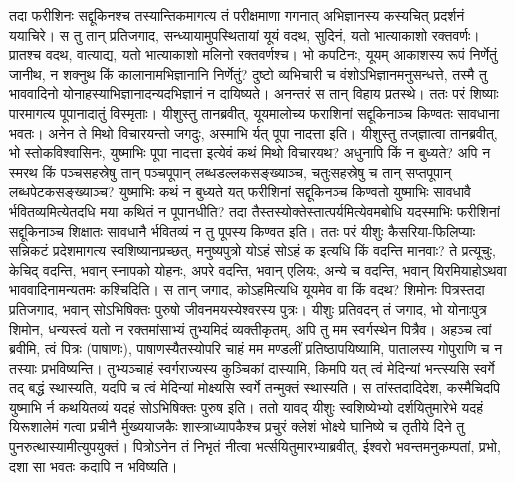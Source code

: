 \adhyAya
{}
\vakya तदा फरीशिनः सद्दूकिनश्च तस्यान्तिकमागत्य तं परीक्षमाणा गगनात् अभिज्ञानस्य कस्यचित् प्रदर्शनं ययाचिरे।
\vakya स तु तान् प्रतिजगाद, सन्ध्यायामुपस्थितायां यूयं वदथ, सुदिनं, यतो भात्याकाशो रक्तवर्णः।
\vakya प्रातश्च वदथ, वात्याद्य, यतो भात्याकाशो मलिनो रक्तवर्णश्च। भो कपटिनः, यूयम् आकाशस्य रूपं निर्णेतुं जानीथ, न शक्नुथ किं कालानामभिज्ञानानि निर्णेतुं?
\vakya दुष्टो व्यभिचारी च वंशोऽभिज्ञानमनुसन्धत्ते, तस्मै तु भाववादिनो योनाहस्याभिज्ञानादन्यदभिज्ञानं न दायिष्यते। अनन्तरं स तान् विहाय प्रतस्थे।
\vakya ततः परं शिष्याः पारमागत्य पूपानादातुं विस्मृताः।
\vakya यीशुस्तु तानब्रवीत्, यूयमालोच्य फराशिनां सद्दूकिनाञ्च किण्वतः सावधाना भवतः।
\vakya अनेन ते मिथो विचारयन्तो जगदुः, अस्माभि र्यत् पूपा नादत्ता इति।
\vakya यीशुस्तु तज्‌ज्ञात्वा तानब्रवीत्, भो स्तोकविश्वासिनः, युष्माभिः पूपा नादत्ता इत्येवं कथं मिथो विचारयथ?
\vakya अधुनापि किं न बुध्यते? अपि न स्मरथ किं पञ्चसहस्रेषु तान् पञ्चपूपान् लब्धडल्लकसङ्ख्याञ्च,
\vakya चतुःसहस्रेषु च तान् सप्तपूपान् लब्धपेटकसङ्ख्याञ्च?
\vakya युष्माभिः कथं न बुध्यते यत् फरीशिनां सद्दूकिनञ्च किण्वतो युष्माभिः सावधावै र्भवितव्यमित्येतदधि मया कथितं न पूपानधीति?
\vakya तदा तैस्तस्योक्तेस्तात्पर्यमित्येवमबोधि यदस्माभिः फरीशिनां सद्दूकिनाञ्च शिक्षातः सावधानै र्भवितव्यं न तु पूपस्य किण्वत इति।
\vakya ततः परं यीशुः कैसरिया-फिलिप्याः सन्निकटं प्रदेशमागत्य स्वशिष्यानप्रच्छत्, मनुष्यपुत्रो योऽहं सोऽहं क इत्यधि किं वदन्ति मानवाः?
\vakya ते प्रत्यूचुः, केचिद् वदन्ति, भवान् स्नापको योहनः, अपरे वदन्ति, भवान् एलियः, अन्ये च वदन्ति, भवान् यिरमियाहोऽथवा भाववादिनामन्यतमः कश्चिदिति।
\vakya स तान् जगाद, कोऽहमित्यधि यूयमेव वा किं वदथ?
\vakya शिमोनः पित्रस्तदा प्रतिजगाद, भवान् सोऽभिषिक्तः पुरुषो जीवनमयस्येश्वरस्य पुत्रः।
\vakya यीशुः प्रतिवदन् तं जगाद, भो योनाःपुत्र शिमोन, धन्यस्त्वं यतो न रक्तमांसाभ्यं तुभ्यमिदं व्यक्तीकृतम्, अपि तु मम स्वर्गस्थेन पित्रैव।
\vakya अहञ्च त्वां ब्रवीमि, त्वं पित्रः (पाषाणः), पाषाणस्यैतस्योपरि चाहं मम मण्डलीं प्रतिष्ठापयिष्यामि, पातालस्य गोपुराणि च न तस्याः प्रभविष्यन्ति।
\vakya तुभ्यञ्चाहं स्वर्गराज्यस्य कुञ्चिकां दास्यामि, किमपि यत् त्वं मेदिन्यां भन्त्स्यसि स्वर्गे तद् बद्धं स्थास्यति, यदपि च त्वं मेदिन्यां मोक्ष्यसि स्वर्गे तन्मुक्तं स्थास्यति।
\vakya स तांस्तदादिदेश, कस्मैचिदपि युष्माभि र्न कथयितव्यं यदहं सोऽभिषिक्तः पुरुष इति।
\vakya ततो यावद् यीशुः स्वशिष्येभ्यो दर्शयितुमारेभे यदहं यिरूशालेमं गत्वा प्रचीनै र्मुख्ययाजकैः शास्त्राध्यापकैश्च प्रचुरं क्लेशं भोक्ष्ये घानिष्ये च तृतीये दिने तु पुनरुत्थास्यामीत्युपयुक्तं।
\vakya पित्रोऽनेन तं निभृतं नीत्वा भर्त्सयितुमारभ्याब्रवीत्, ईश्वरो भवन्तमनुकम्पतां, प्रभो, दशा सा भवतः कदापि न भविष्यति।
